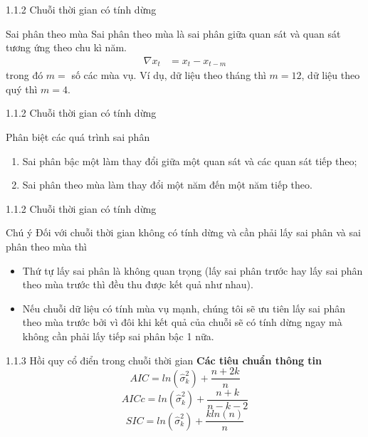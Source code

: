 \documentclass[notheorems,envcountsect,hyperref=unicode]{beamer}
\begin{document}
\begin{frame}{1.1.2 Chuỗi thời gian có tính dừng}
\begin{block}{Sai phân theo mùa}
Sai phân theo mùa là sai phân giữa quan sát và quan sát tương ứng theo chu kì năm.	
\begin{align*}
\nabla x_{t}&=x_{t}-x_{t-m}
\end{align*}
trong đó $m =$ số các mùa vụ. Ví dụ, dữ liệu theo tháng thì $m = 12$, dữ liệu theo quý thì $m =4$.
\end{block}
\end{frame}

\begin{frame}{1.1.2 Chuỗi thời gian có tính dừng}
	\begin{block}{{Phân biệt các quá trình sai phân}}
		\begin{enumerate}
			\item Sai phân bậc một làm thay đổi giữa một quan sát và các quan sát tiếp theo;
			\item Sai phân theo mùa làm thay đổi một năm đến một năm tiếp theo.
		\end{enumerate}
	\end{block}
\end{frame}

\begin{frame}{1.1.2 Chuỗi thời gian có tính dừng}
\begin{block}{Chú ý \cite{3}}
Đối với chuỗi thời gian không có tính dừng và cần phải lấy sai phân và sai phân theo mùa thì
\begin{itemize}
	\item Thứ tự lấy sai phân là không quan trọng (lấy sai phân trước hay lấy sai phân theo mùa trước thì đều thu được kết quả như nhau).
	\item Nếu chuỗi dữ liệu có tính mùa vụ mạnh, chúng tôi sẽ ưu tiên lấy sai phân theo mùa trước bởi vì đôi khi kết quả của chuỗi sẽ có tính dừng ngay mà không cần phải lấy tiếp sai phân bậc 1 nữa.
\end{itemize}
\end{block}
\end{frame}

\begin{frame}{1.1.3 Hồi quy cổ điển trong chuỗi thời gian}
	\textbf{Các tiêu chuẩn thông tin \cite{1}}
	\begin{equation}
	AIC= ln (\widehat{\sigma}_{k}^{2}) +\dfrac{n+ 2k}{n} \label{ct1.60}
	\end{equation}
	\begin{equation}
	AICc= ln (\widehat{\sigma}_{k}^{2}) +\dfrac{n+ k}{n-k-2} \label{ct1.61}
	\end{equation} 
	\begin{equation}
	SIC= ln (\widehat{\sigma}_{k}^{2}) +\dfrac{kln(n)}{n} \label{ct1.62}
	\end{equation}
\end{frame}
\end{document}
